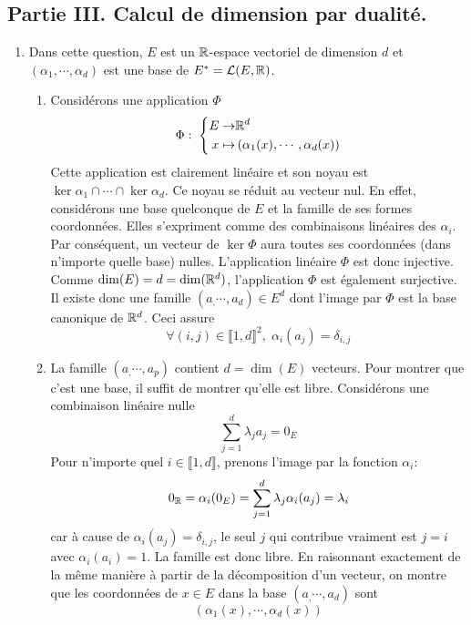 \subsection*{Partie III. Calcul de dimension par dualité.}
\begin{enumerate}
  \item Dans cette question, $E$ est un $\mathbb{R}$-espace vectoriel de dimension $d$ et $(\alpha_1,\cdots,\alpha_d)$ est une base de $E^*=\mathcal{L}(E,\mathbb{R})$.
\begin{enumerate}
  \item Considérons une application $\Phi$
\begin{displaymath}
\Phi: \;
\left\lbrace 
\begin{aligned}
  E \rightarrow& \mathbb{R}^d \\ x \mapsto& \left( \alpha_1(x), \cdots , \alpha_d(x)\right) 
\end{aligned}
\right. 
\end{displaymath}
Cette application est clairement linéaire et son noyau est $\ker \alpha_1 \cap \cdots \cap \ker \alpha_d$. Ce noyau se réduit au vecteur nul. En effet, considérons une base quelconque de $E$ et la famille de ses formes coordonnées. Elles s'expriment comme des combinaisons linéaires des $\alpha_i$. Par conséquent, un vecteur de $\ker \Phi$ aura toutes ses coordonnées (dans n'importe quelle base) nulles. L'application linéaire $\Phi$ est donc injective. Comme $\dim(E) = d = \dim(\mathbb{R}^d)$, l'application $\Phi$ est également surjective. Il existe donc une famille $(a_,\cdots,a_d)\in E^d$ dont l'image par $\Phi$ est la base canonique de $\mathbb{R}^d$. Ceci assure
\begin{displaymath}
\forall (i,j)\in \llbracket 1,d \rrbracket^2, \; \alpha_i(a_j) = \delta_{i,j}  
\end{displaymath}

  \item La famille $(a_,\cdots,a_p)$ contient $d=\dim(E)$ vecteurs. Pour montrer que c'est une base, il suffit de montrer qu'elle est libre. Considérons une combinaison linéaire nulle
\begin{displaymath}
  \sum_{j=1}^d \lambda_j a_j = 0_E
\end{displaymath}
Pour n'importe quel $i\in \llbracket 1,d \rrbracket$, prenons l'image par la fonction $\alpha_i$:
\begin{displaymath}
  0_{\mathbb{R}} = \alpha_i(0_E) = \sum_{j=1}^d \lambda_j \alpha_i(a_j) = \lambda_i
\end{displaymath}
car à cause de $\alpha_i(a_j) = \delta_{i,j}$, le seul $j$ qui contribue vraiment est $j=i$ avec $\alpha_i(a_i)=1$. La famille est donc libre.\newline
En raisonnant exactement de la même manière à partir de la décomposition d'un vecteur, on montre que les coordonnées de $x\in E$ dans la base $(a_, \cdots, a_d)$ sont
\begin{displaymath}
  \left( \alpha_1(x), \cdots , \alpha_d(x) \right) 
\end{displaymath}


\end{enumerate}
\end{enumerate}
